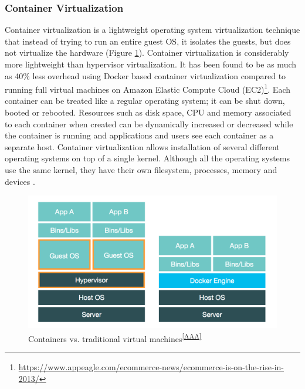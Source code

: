 \documentclass[a4paper,11pt,twoside]{report}
\begin{document}
\subsubsection*{Container Virtualization} 
Container virtualization is a lightweight operating system virtualization technique that instead of trying to run an entire guest OS, it isolates the guests, but does not virtualize the hardware  \cite{container} (Figure \ref{vm vs container}). Container virtualization is considerably more lightweight than hypervisor virtualization. It has been found to be as much as 40\% less overhead using Docker based container virtualization compared to running full virtual machines on Amazon Elastic Compute Cloud (EC2)\footnote{\url{https://www.appeagle.com/ecommerce-news/ecommerce-is-on-the-rise-in-2013/}}. Each container can be treated like a regular operating system; it can be shut down, booted or rebooted. Resources such as disk space, CPU and memory associated to each container when created can be dynamically increased or decreased while the container is running and applications and users see each container as a separate host. Container virtualization allows installation of several different operating systems on top of a single kernel. Although all the operating systems use the same kernel, they have their own filesystem, processes, memory and devices \cite{container}. \bigskip


\begin{figure}[!ht]
  \centering
     \includegraphics[scale=1.1]{containervsvm}
  \caption{Containers vs. traditional virtual machines\textsuperscript{\ref{AAA}}}%
  \label{vm vs container}  
\end{figure}
\vspace{-18pt}
\end{document}
